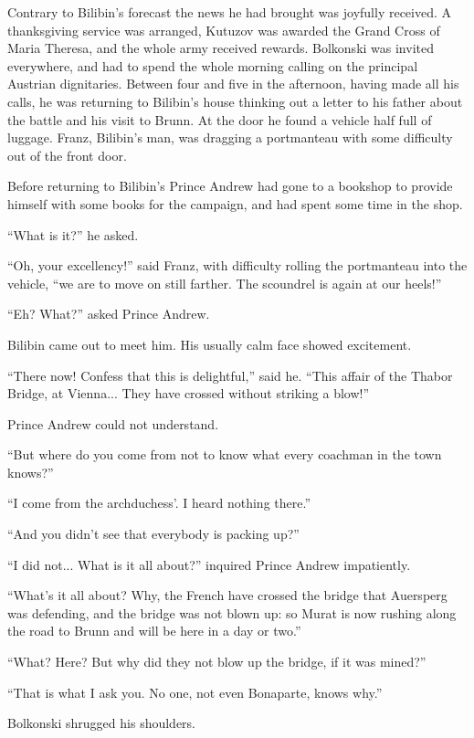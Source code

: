 Contrary to Bilibin's forecast the news he had brought was
joyfully received. A thanksgiving service was arranged, Kutuzov
was awarded the Grand Cross of Maria Theresa, and the whole army
received rewards.  Bolkonski was invited everywhere, and had to
spend the whole morning calling on the principal Austrian
dignitaries. Between four and five in the afternoon, having made
all his calls, he was returning to Bilibin's house thinking out a
letter to his father about the battle and his visit to Brunn. At
the door he found a vehicle half full of luggage. Franz,
Bilibin's man, was dragging a portmanteau with some difficulty
out of the front door.

Before returning to Bilibin's Prince Andrew had gone to a
bookshop to provide himself with some books for the campaign, and
had spent some time in the shop.

``What is it?'' he asked.

``Oh, your excellency!'' said Franz, with difficulty rolling the
portmanteau into the vehicle, ``we are to move on still
farther. The scoundrel is again at our heels!''

``Eh? What?'' asked Prince Andrew.

Bilibin came out to meet him. His usually calm face showed
excitement.

``There now! Confess that this is delightful,'' said he. ``This
affair of the Thabor Bridge, at Vienna... They have crossed
without striking a blow!''

Prince Andrew could not understand.

``But where do you come from not to know what every coachman in
the town knows?''

``I come from the archduchess'. I heard nothing there.''

``And you didn't see that everybody is packing up?''

``I did not... What is it all about?'' inquired Prince Andrew
impatiently.

``What's it all about? Why, the French have crossed the bridge
that Auersperg was defending, and the bridge was not blown up: so
Murat is now rushing along the road to Brunn and will be here in
a day or two.''

``What? Here? But why did they not blow up the bridge, if it was
mined?''

``That is what I ask you. No one, not even Bonaparte, knows
why.''

Bolkonski shrugged his shoulders.

